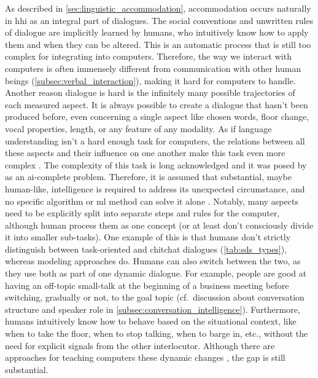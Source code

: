 As described in \cref{sec:linguistic_accommodation}, accommodation occurs naturally in \ac{hhi} as an integral part of dialogues.
The social conventions and unwritten rules of dialogue are implicitly learned by humans, who intuitively know how to apply them and when they can be altered.
This is an automatic process that is still too complex for integrating into computers.
Therefore, the way we interact with computers is often immensely different from communication with other human beings (\cref{subsec:verbal_interaction}), making it hard for computers to handle.
Another reason dialogue is hard is the infinitely many possible trajectories of each measured aspect.
It is always possible to create a dialogue that hasn't been produced before, even concerning a single aspect like chosen words, floor change, vocal properties, length, or any feature of any modality.
As if language understanding isn't a hard enough task for computers, the relations between all these aspects and their influence on one another make this task even more complex \citep{Gordon2018evaluating}.
The complexity of this task is long acknowledged and it was posed by \citet{Turing1950computing} as an \acs{ai}-complete problem.
Therefore, it is assumed that substantial, maybe human-like, intelligence is required to address its unexpected circumstance, and no specific algorithm or \ac{ml} method can solve it alone \citep[see further reasoning and examples in][pp.~54-57]{Shapiro1992encyclopedia}.
Notably, many aspects need to be explicitly split into separate steps and rules for the computer, although human process them as one concept (or at least don't consciously divide it into smaller sub-tasks).
One example of this is that humans don't strictly distinguish between task-oriented and chitchat dialogues (\cref{tab:sds_types}), whereas modeling approaches do.
Humans can also switch between the two, as they use both as part of one dynamic dialogue.
For example, people are good at having an off-topic small-talk at the beginning of a business meeting before switching, gradually or not, to the goal topic (cf.\ discussion about conversation structure and speaker role in \cref{subsec:conversation_intelligence}).
Furthermore, humans intuitively know how to behave based on the situational context, like when to take the floor, when to stop talking, when to barge in, etc., without the need for explicit signals from the other interlocutor.
Although there are approaches for teaching computers these dynamic changes \citep[e.g.,][]{Skantze2009incremental}, the gap is still substantial.

